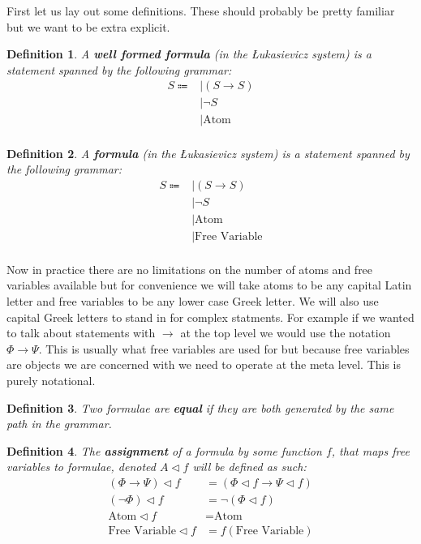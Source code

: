 \documentclass{article}
\newtheorem{defin}{Definition}
\begin{document}
First let us lay out some definitions.
These should probably be pretty familiar but we want to be extra explicit.

\begin{defin}
A \textbf{well formed formula} (in the \L ukasievicz system) is a statement spanned by the following grammar:
\begin{align*}
S \Coloneqq
& \mid (S \rightarrow S)  \\
& \mid \neg S  \\
& \mid \text{Atom} \\
\end{align*} 
\end{defin}

\begin{defin}
A \textbf{formula} (in the \L ukasievicz system) is a statement spanned by the following grammar:
\begin{align*}
S \Coloneqq
& \mid (S \rightarrow S)  \\
& \mid \neg S  \\
& \mid \text{Atom} \\
& \mid \text{Free Variable} \\
\end{align*} 
\end{defin}

Now in practice there are no limitations on the number of atoms and free variables available but for convenience we will take atoms to be any capital Latin letter and free variables to be any lower case Greek letter.
We will also use capital Greek letters to stand in for complex statments.
For example if we wanted to talk about statements with $\rightarrow$ at the top level we would use the notation $\Phi \rightarrow \Psi$.
This is usually what free variables are used for but because free variables are objects we are concerned with we need to operate at the meta level.
This is purely notational.

\begin{defin}
Two formulae are \textbf{equal} if they are both generated by the same path in the grammar.
\end{defin}

\begin{defin}
The \textbf{assignment} of a formula by some function $f$, that maps free variables to formulae, denoted $A \lhd f$ will be defined as such:
\begin{align*}
(\Phi \rightarrow \Psi) \lhd f &= (\Phi \lhd f \rightarrow \Psi \lhd f) \\
(\neg \Phi) \lhd f &= \neg (\Phi \lhd f) \\
\text{Atom} \lhd f &= \text{Atom} \\
\text{Free Variable} \lhd f &= f(\text{Free Variable}) \\
\end{align*}
\end{defin}
\end{document}
